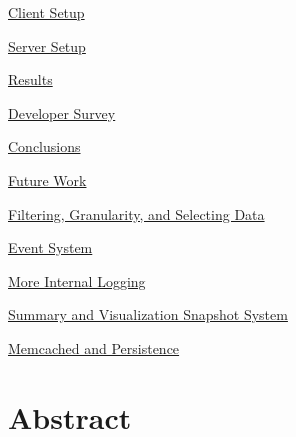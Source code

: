 \documentclass[10pt,a4paper,english]{article}
\begin{document}
\begin{list}{}{}
\begin{list}{}{}
\item {} \href{\#client-setup}{Client Setup}

\item {} \href{\#server-setup}{Server Setup}

\item {} \href{\#results}{Results}

\item {} \href{\#developer-survey}{Developer Survey}

\end{list}

\item {} \href{\#conclusions}{Conclusions}

\item {} \href{\#future-work}{Future Work}
\begin{list}{}{}
\item {} \href{\#filtering-granularity-and-selecting-data}{Filtering, Granularity, and Selecting Data}

\item {} \href{\#event-system}{Event System}

\item {} \href{\#more-internal-logging}{More Internal Logging}

\item {} \href{\#summary-and-visualization-snapshot-system}{Summary and Visualization Snapshot System}

\item {} \href{\#memcached-and-persistence}{Memcached and Persistence}

\end{list}

\end{list}



\pagebreak{}




\hypertarget{abstract}{}
\section*{Abstract}
\label{abstract}
\end{document}
